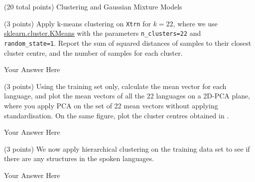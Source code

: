 \documentclass[12pt]{article}
\begin{document}
\begin{question}{(20 total points) Clustering and Gaussian Mixture Models}  


  


  \medskip
   \begin{subquestion}{(3 points)
       Apply k-means clustering on {\tt Xtrn} for $k = 22$, where we use
       \href{https://scikit-learn.org/0.19/modules/generated/sklearn.cluster.KMeans.html}{sklearn.cluster.KMeans}
       with the parameters {\tt n\_clusters=22} and {\tt random\_state=1}.
       Report the sum of squared distances of samples to their closest
       cluster centre, and the number of samples for each cluster.
     } \label{Q3.1}
   

      \begin{answerbox}{35em}
         Your Answer Here
      \end{answerbox}
  


   \end{subquestion}
   \begin{subquestion}{(3 points)
       Using the training set only,
       calculate the mean vector for each language, and plot the mean
       vectors of all the 22 languages on a 2D-PCA plane, where you
       apply PCA on the set of 22 mean vectors without applying
       standardisation.  
       On the same figure, plot the cluster centres obtained in .
     } \label{Q3.2}

   

      \begin{answerbox}{35em}
         Your Answer Here
      \end{answerbox}
  


   \end{subquestion}
   \begin{subquestion}{(3 points)
       We now apply hierarchical clustering on the training data set
       to see if there are any structures in the spoken languages.
     } \label{Q3.3}


     

      \begin{answerbox}{35em}
         Your Answer Here
      \end{answerbox}
  



\end{subquestion}
\end{question}
\end{document}
